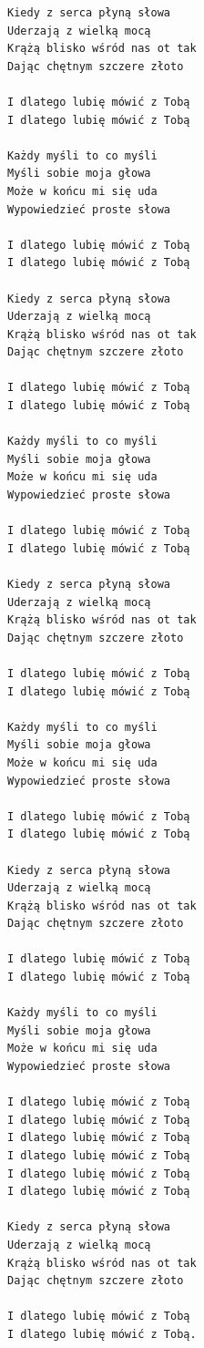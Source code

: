 \documentclass[12pt]{article}
\begin{document}
\begin{verbatim}
Kiedy z serca płyną słowa
Uderzają z wielką mocą
Krążą blisko wśród nas ot tak
Dając chętnym szczere złoto

I dlatego lubię mówić z Tobą
I dlatego lubię mówić z Tobą

Każdy myśli to co myśli
Myśli sobie moja głowa
Może w końcu mi się uda
Wypowiedzieć proste słowa

I dlatego lubię mówić z Tobą
I dlatego lubię mówić z Tobą

Kiedy z serca płyną słowa
Uderzają z wielką mocą
Krążą blisko wśród nas ot tak
Dając chętnym szczere złoto

I dlatego lubię mówić z Tobą
I dlatego lubię mówić z Tobą

Każdy myśli to co myśli
Myśli sobie moja głowa
Może w końcu mi się uda
Wypowiedzieć proste słowa

I dlatego lubię mówić z Tobą
I dlatego lubię mówić z Tobą

Kiedy z serca płyną słowa
Uderzają z wielką mocą
Krążą blisko wśród nas ot tak
Dając chętnym szczere złoto

I dlatego lubię mówić z Tobą
I dlatego lubię mówić z Tobą

Każdy myśli to co myśli
Myśli sobie moja głowa
Może w końcu mi się uda
Wypowiedzieć proste słowa

I dlatego lubię mówić z Tobą
I dlatego lubię mówić z Tobą

Kiedy z serca płyną słowa
Uderzają z wielką mocą
Krążą blisko wśród nas ot tak
Dając chętnym szczere złoto

I dlatego lubię mówić z Tobą
I dlatego lubię mówić z Tobą

Każdy myśli to co myśli
Myśli sobie moja głowa
Może w końcu mi się uda
Wypowiedzieć proste słowa

I dlatego lubię mówić z Tobą
I dlatego lubię mówić z Tobą
I dlatego lubię mówić z Tobą
I dlatego lubię mówić z Tobą
I dlatego lubię mówić z Tobą
I dlatego lubię mówić z Tobą

Kiedy z serca płyną słowa
Uderzają z wielką mocą
Krążą blisko wśród nas ot tak
Dając chętnym szczere złoto

I dlatego lubię mówić z Tobą
I dlatego lubię mówić z Tobą.
\end{verbatim}
\clearpage
\end{document}
